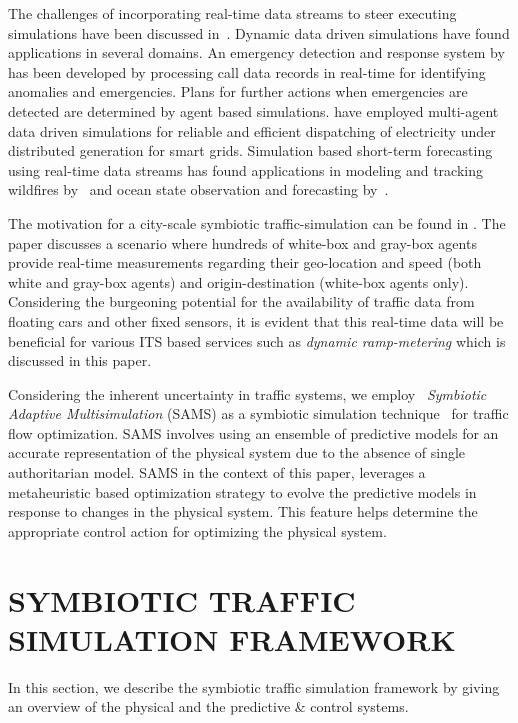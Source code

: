 \documentclass{wscpaperproc}
\theoremstyle{wsc}
\begin{document}
 The challenges of incorporating real-time data streams to steer executing simulations have been discussed in~\cite{darema2004dynamic}. Dynamic data driven simulations have found applications in several domains. An emergency detection and response system by~ has been developed by processing call data records in real-time for identifying anomalies and emergencies. Plans for further actions when emergencies are detected are determined by agent based simulations.  have employed multi-agent data driven simulations for reliable and efficient dispatching of electricity under distributed generation for smart grids. Simulation based short-term forecasting using real-time data streams has found applications in modeling and tracking wildfires by~ and ocean state observation and forecasting by~. 
 
 The motivation for a city-scale symbiotic traffic-simulation can be found in . The paper discusses a scenario where hundreds of white-box and gray-box agents provide real-time measurements regarding their geo-location and speed (both white and gray-box agents) and origin-destination (white-box agents only). Considering the burgeoning potential for the availability of traffic data from floating cars and other fixed sensors, it is evident that this real-time data will be beneficial for various ITS based services such as {\it dynamic ramp-metering} which is discussed in this paper.
 
 Considering the inherent uncertainty in traffic systems, we employ ~{\it Symbiotic Adaptive Multisimulation} (SAMS) as a symbiotic simulation technique~\cite{mitchell2008symbiotic} for traffic flow optimization. SAMS involves using an ensemble of predictive models for an accurate representation of the physical system due to the absence of single authoritarian model. SAMS in the context of this paper, leverages a metaheuristic based optimization strategy to evolve the predictive models in response to changes in the physical system. This feature helps determine the appropriate control action for optimizing the physical system.  

\section{SYMBIOTIC TRAFFIC SIMULATION FRAMEWORK}
In this section, we describe the symbiotic traffic simulation framework by giving an overview of the physical and the predictive \& control systems.
\end{document}
